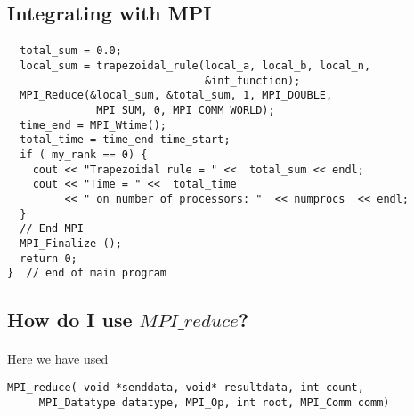 \subsection*{Integrating with \textbf{MPI}}

\paragraph{}


















\begin{verbatim}
  total_sum = 0.0;
  local_sum = trapezoidal_rule(local_a, local_b, local_n, 
                               &int_function); 
  MPI_Reduce(&local_sum, &total_sum, 1, MPI_DOUBLE, 
              MPI_SUM, 0, MPI_COMM_WORLD);
  time_end = MPI_Wtime();
  total_time = time_end-time_start;
  if ( my_rank == 0) {
    cout << "Trapezoidal rule = " <<  total_sum << endl;
    cout << "Time = " <<  total_time  
         << " on number of processors: "  << numprocs  << endl;
  }
  // End MPI
  MPI_Finalize ();  
  return 0;
}  // end of main program

\end{verbatim}



\subsection*{How do I use $MPI\_reduce$?}

\paragraph{}

Here we have used



\begin{verbatim}
MPI_reduce( void *senddata, void* resultdata, int count, 
     MPI_Datatype datatype, MPI_Op, int root, MPI_Comm comm)

\end{verbatim}


